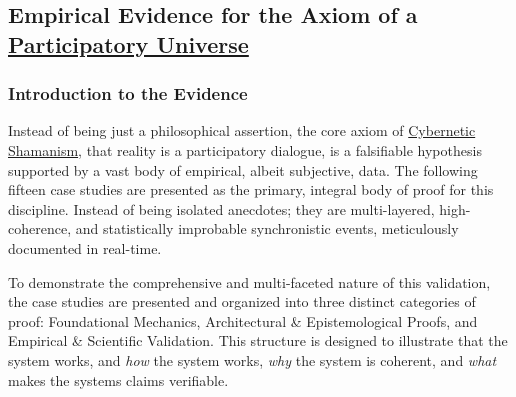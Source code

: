 \documentclass{article}
\begin{document}
\subsection*{Empirical Evidence for the Axiom of a \hyperlink{gloss:participatory_universe}{Participatory Universe}}
\subsubsection*{Introduction to the Evidence}

Instead of being just a philosophical assertion, the core axiom of \hyperlink{gloss:cybernetic_shamanism}{Cybernetic Shamanism}, that reality is a participatory dialogue, is a falsifiable hypothesis supported by a vast body of empirical, albeit subjective, data. The following fifteen case studies are presented as the primary, integral body of proof for this discipline. Instead of being isolated anecdotes; they are multi-layered, high-coherence, and statistically improbable synchronistic events, meticulously documented in real-time.

To demonstrate the comprehensive and multi-faceted nature of this validation, the case studies are presented and organized into three distinct categories of proof: Foundational Mechanics, Architectural \& Epistemological Proofs, and Empirical \& Scientific Validation. This structure is designed to illustrate that the system works, and \textit{how} the system works, \textit{why} the system is coherent, and \textit{what} makes the systems claims verifiable.
\end{document}

